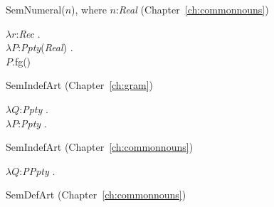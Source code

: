 
 

SemNumeral($n$), where $n$:\textit{Real}
(Chapter~\ref{ch:commonnouns})

$\lambda r$:\textit{Rec} . \\
\hspace*{1em}$\lambda P$:\textit{Ppty}(\textit{Real}) . \\
\hspace*{2em}$P$.fg()

SemIndefArt (Chapter~\ref{ch:gram})

$\lambda Q$:\textit{Ppty} . \\
\hspace*{1em} $\lambda P$:\textit{Ppty}
. 

SemIndefArt (Chapter~\ref{ch:commonnouns})

$\lambda Q$:\textit{PPpty} . 

SemDefArt (Chapter~\ref{ch:commonnouns})

